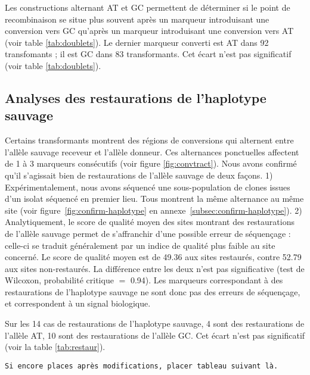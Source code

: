 Les constructions alternant AT et GC permettent de déterminer si le point de
recombinaison se situe plus souvent après un marqueur introduisant une
conversion vers GC qu'après un marqueur introduisant une conversion vers AT
(voir table \ref{tab:doublets}). Le dernier marqueur converti est AT dans 92
transfomants ; il est GC dans 83 transformants. Cet écart n'est pas
significatif (voir table \ref{tab:doublets}).



\subsection{Analyses des restaurations de l'haplotype sauvage}
\label{subsec:restaur}


Certains transformants montrent des régions de conversions qui alternent entre
l'allèle sauvage receveur et l'allèle donneur. Ces alternances ponctuelles
affectent de 1 à 3 marqueurs consécutifs (voir figure \ref{fig:convtract}). Nous
avons confirmé qu'il s'agissait bien de restaurations de l'allèle sauvage de
deux façons. 1) Expérimentalement, nous avons séquencé une sous-population de
clones issues d'un isolat séquencé en premier lieu. Tous montrent la même
alternance au même site (voir figure~\ref{fig:confirm-haplotype} en
annexe~\ref{subsec:confirm-haplotype}). 2) Analytiquement, le score de qualité
moyen des sites montrant des restaurations de l'allèle sauvage permet de
s'affranchir d'une possible erreur de séquençage : celle-ci se traduit
généralement par un indice de qualité plus faible au site concerné. Le score de
qualité moyen est de \num{49.36} aux sites restaurés, contre \num{52.79} aux
sites non-restaurés. La différence entre les deux n'est pas significative (test
de Wilcoxon, probabilité critique \(=\) \num{0.94}). Les marqueurs correspondant
à des restaurations de l'haplotype sauvage ne sont donc pas des erreurs de
séquençage, et correspondent à un signal biologique.

Sur les 14 cas de restaurations de l'haplotype sauvage, 4 sont des restaurations
de l'allèle AT, 10 sont des restaurations de l'allèle GC. Cet écart n'est pas
significatif (voir la table \ref{tab:restaur}).

\texttt{Si encore places après modifications, placer tableau suivant là. }

